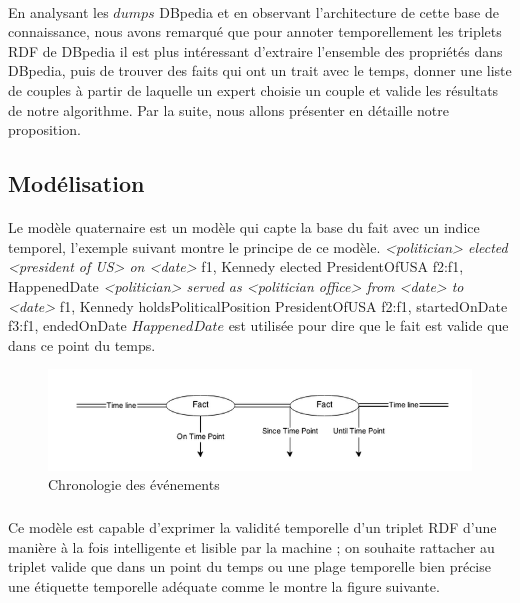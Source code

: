 \documentclass[12pt,a4	]{report}
\begin{document}
\paragraph{}
En analysant les $dumps$ DBpedia et en observant l'architecture de cette base de connaissance, nous avons remarqué que pour annoter temporellement les triplets RDF de DBpedia il est plus intéressant d'extraire l'ensemble des propriétés dans DBpedia, puis de trouver des faits qui ont un trait avec le temps, donner une liste de couples à partir de laquelle un expert choisie un couple et valide les résultats de notre algorithme. Par la suite, nous allons présenter en détaille notre proposition.
\subsection*{Modélisation}
\paragraph{}
Le modèle quaternaire est un modèle qui capte la base du fait avec un indice temporel, l'exemple suivant montre le principe de ce modèle.
\newline
{\it <politician> elected <president of US> on <date>}
\newline
f1, Kennedy elected PresidentOfUSA 
\newline
f2:f1, HappenedDate
\newline
{\it <politician> served as <politician office> from <date> to <date>}
\newline
f1, Kennedy holdsPoliticalPosition PresidentOfUSA 
\newline
f2:f1, startedOnDate 
\newline
f3:f1, endedOnDate
\newline
$HappenedDate$ est utilisée pour dire que le fait est valide que dans ce point du temps.
\begin{figure}[H]
        \centering
                \centering
                \includegraphics[width=13cm]{timeline.png}
               \caption{Chronologie des événements}

\end{figure}
\subparagraph{}
Ce modèle est capable d'exprimer la validité temporelle d’un triplet RDF d’une manière à la fois intelligente et lisible par la machine ; on souhaite rattacher au triplet valide que dans un point du temps ou une plage temporelle bien précise une étiquette temporelle adéquate comme le montre la figure suivante.
\end{document}

